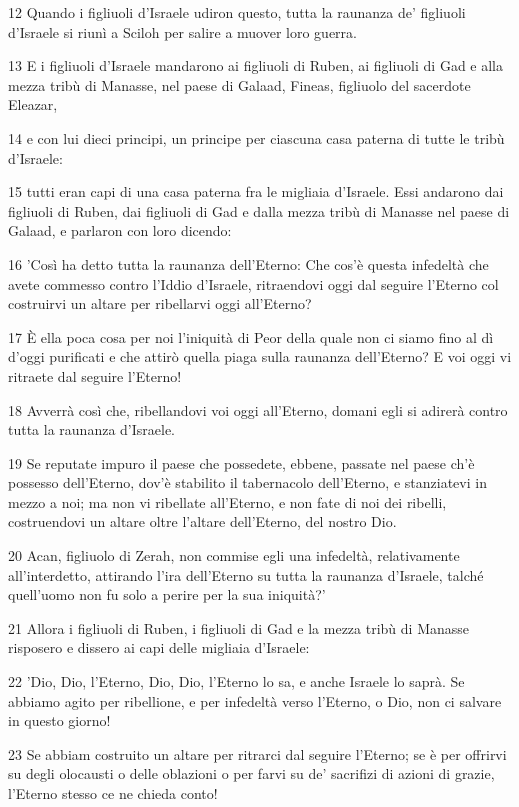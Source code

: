 \par 12 Quando i figliuoli d'Israele udiron questo, tutta la raunanza de' figliuoli d'Israele si riunì a Sciloh per salire a muover loro guerra.
\par 13 E i figliuoli d'Israele mandarono ai figliuoli di Ruben, ai figliuoli di Gad e alla mezza tribù di Manasse, nel paese di Galaad, Fineas, figliuolo del sacerdote Eleazar,
\par 14 e con lui dieci principi, un principe per ciascuna casa paterna di tutte le tribù d'Israele:
\par 15 tutti eran capi di una casa paterna fra le migliaia d'Israele. Essi andarono dai figliuoli di Ruben, dai figliuoli di Gad e dalla mezza tribù di Manasse nel paese di Galaad, e parlaron con loro dicendo:
\par 16 'Così ha detto tutta la raunanza dell'Eterno: Che cos'è questa infedeltà che avete commesso contro l'Iddio d'Israele, ritraendovi oggi dal seguire l'Eterno col costruirvi un altare per ribellarvi oggi all'Eterno?
\par 17 È ella poca cosa per noi l'iniquità di Peor della quale non ci siamo fino al dì d'oggi purificati e che attirò quella piaga sulla raunanza dell'Eterno? E voi oggi vi ritraete dal seguire l'Eterno!
\par 18 Avverrà così che, ribellandovi voi oggi all'Eterno, domani egli si adirerà contro tutta la raunanza d'Israele.
\par 19 Se reputate impuro il paese che possedete, ebbene, passate nel paese ch'è possesso dell'Eterno, dov'è stabilito il tabernacolo dell'Eterno, e stanziatevi in mezzo a noi; ma non vi ribellate all'Eterno, e non fate di noi dei ribelli, costruendovi un altare oltre l'altare dell'Eterno, del nostro Dio.
\par 20 Acan, figliuolo di Zerah, non commise egli una infedeltà, relativamente all'interdetto, attirando l'ira dell'Eterno su tutta la raunanza d'Israele, talché quell'uomo non fu solo a perire per la sua iniquità?'
\par 21 Allora i figliuoli di Ruben, i figliuoli di Gad e la mezza tribù di Manasse risposero e dissero ai capi delle migliaia d'Israele:
\par 22 'Dio, Dio, l'Eterno, Dio, Dio, l'Eterno lo sa, e anche Israele lo saprà. Se abbiamo agito per ribellione, e per infedeltà verso l'Eterno, o Dio, non ci salvare in questo giorno!
\par 23 Se abbiam costruito un altare per ritrarci dal seguire l'Eterno; se è per offrirvi su degli olocausti o delle oblazioni o per farvi su de' sacrifizi di azioni di grazie, l'Eterno stesso ce ne chieda conto!
